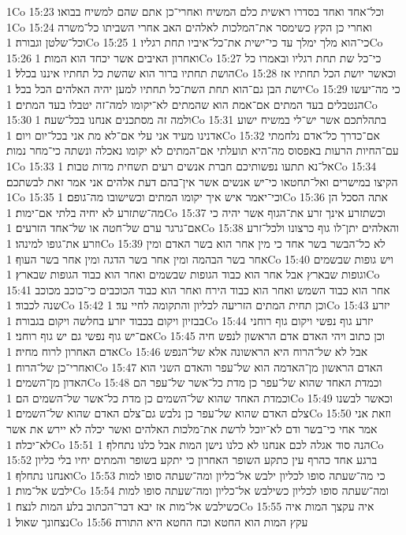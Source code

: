 1Co 15:23  וכל־אחד ואחד בסדרו ראשית כלם המשיח ואחרי־כן אתם שהם למשיח בבואו׃
1Co 15:24  ואחרי כן הקץ כשימסר את־המלכות לאלהים האב אחרי השביתו כל־משרה וכל־שלטן וגבורה׃
1Co 15:25  כי־הוא מלך ימלך עד כי־ישית את־כל־איביו תחת רגליו׃
1Co 15:26  ואחרון האיבים אשר יכחד הוא המות׃
1Co 15:27  כי־כל שת תחת רגליו ובאמרו כל הושת תחתיו ברור הוא שהשת כל תחתיו איננו בכלל׃
1Co 15:28  וכאשר יושת הכל תחתיו אז יושת הבן גם־הוא תחת השת־כל תחתיו למען יהיה האלהים הכל בכל׃
1Co 15:29  כי מה־יעשו הנטבלים בעד המתים אם־אמת הוא שהמתים לא־יקומו למה־זה יטבלו בעד המתים׃
1Co 15:30  ולמה זה מסתכנים אנחנו בכל־שעה׃
1Co 15:31  בתהלתכם אשר יש־לי במשיח ישוע אדנינו מעיד אני עלי אם־לא מת אני בכל־יום ויום׃
1Co 15:32  אם־כדרך כל־אדם נלחמתי עם־החיות הרעות באפסוס מה־היא תועלתי אם־המתים לא יקומו נאכלה ונשתה כי־מחר נמות׃
1Co 15:33  אל־נא תתעו נפשותיכם חברת אנשים רעים תשחית מדות טבות׃
1Co 15:34  הקיצו במישרים ואל־תחטאו כי־יש אנשים אשר אין־בהם דעת אלהים אני אמר זאת לבשתכם׃
1Co 15:35  וכי־יאמר איש איך יקומו המתים וכשישובו מה־גופם׃
1Co 15:36  אתה הסכל הן מה־שתזרע לא יחיה בלתי אם־ימות׃
1Co 15:37  וכשתזרע אינך זרע את־הגוף אשר יהיה כי אם־גרגר ערם של־חטה או של־אחד הזרעים׃
1Co 15:38  והאלהים יתן־לו גוף כרצונו ולכל־זרע וזרע את־גופו למינהו׃
1Co 15:39  לא כל־הבשר בשר אחד כי מין אחר הוא בשר האדם ומין אחר בשר הבהמה ומין אחר בשר הדגה ומין אחר בשר העוף׃
1Co 15:40  ויש גופות שבשמים וגופות שבארץ אבל אחר הוא כבוד הגופות שבשמים ואחר הוא כבוד הגופות שבארץ׃
1Co 15:41  אחר הוא כבוד השמש ואחר הוא כבוד הירח ואחר הוא כבוד הכוכבים כי־כוכב מכוכב שנה לכבוד׃
1Co 15:42  וכן תחית המתים הזריעה לכליון והתקומה לחיי עד׃
1Co 15:43  יזרע בבזיון ויקום בכבוד יזרע בחלשה ויקום בגבורה׃
1Co 15:44  יזרע גוף נפשי ויקום גוף רוחני אם־יש גוף נפשי גם יש גוף רוחני׃
1Co 15:45  וכן כתוב ויהי האדם אדם הראשון לנפש חיה אדם האחרון לרוח מחיה׃
1Co 15:46  אבל לא של־הרוח היא הראשונה אלא של־הנפש ואחרי־כן של־הרוח׃
1Co 15:47  האדם הראשון מן־האדמה הוא של־עפר והאדם השני הוא האדון מן־השמים׃
1Co 15:48  וכמדת האחד שהוא של־עפר כן מדת כל־אשר של־עפר הם וכמדת האחד שהוא של־השמים כן מדת כל־אשר של־השמים הם׃
1Co 15:49  וכאשר לבשנו צלם האדם שהוא של־עפר כן נלבש גם־צלם האדם שהוא של־השמים׃
1Co 15:50  וזאת אני אמר אחי כי־בשר ודם לא־יוכל לרשת את־מלכות האלהים ואשר יכלה לא יירש את אשר לא־יכלה׃
1Co 15:51  הנה סוד אגלה לכם אנחנו לא כלנו נישן המות אבל כלנו נתחלף׃
1Co 15:52  ברגע אחד כהרף עין כתקע השופר האחרון כי יתקע בשופר והמתים יחיו בלי כליון ואנחנו נתחלף׃
1Co 15:53  כי מה־שעתה סופו לכליון ילבש אל־כליון ומה־שעתה סופו למות ילבש אל־מות׃
1Co 15:54  ומה־שעתה סופו לכליון כשילבש אל־כליון ומה־שעתה סופו למות כשילבש אל־מות אז יבא דבר־הכתוב בלע המות לנצח׃
1Co 15:55  איה עקצך המות איה נצחונך שאול׃
1Co 15:56  עקץ המות הוא החטא וכח החטא היא התורה׃
